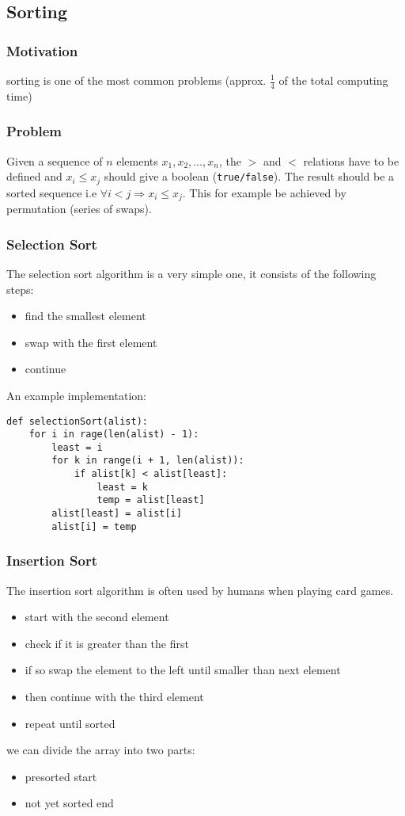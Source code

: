\documentclass[a4paper]{article}
\begin{document}
\subsection{Sorting}
\subsubsection{Motivation}
sorting is one of the most common problems (approx. $ \frac{1}{4} $ of the total computing time)
\subsubsection{Problem}
Given a sequence of $ n $ elements $ x _{1}, x _{2} , \dots, x _{n} $, the $ > $ and $ < $ relations have to be defined and $ x _{i} \leq x _{j} $ should give a boolean (\texttt{true/false}).
The result should be a sorted sequence i.e $ \forall i < j \Rightarrow x_{i} \leq x _{j} $.
This for example be achieved by permutation (series of swaps).
\subsubsection{Selection Sort}
The selection sort algorithm is a very simple one, it consists of the following steps:
\begin{itemize}
    \item find the smallest element
    \item swap with the first element
    \item continue
\end{itemize}
An example implementation:

\begin{lstlisting}
def selectionSort(alist):
    for i in rage(len(alist) - 1):
        least = i
        for k in range(i + 1, len(alist)):
            if alist[k] < alist[least]:
                least = k
                temp = alist[least]
        alist[least] = alist[i]
        alist[i] = temp
\end{lstlisting}

\subsubsection{Insertion Sort}
The insertion sort algorithm is often used by humans when playing card games.
\begin{itemize}
    \item start with the second element
    \item check if it is greater than the first
    \item if so swap the element to the left until smaller than next element
    \item then continue with the third element
    \item repeat until sorted
\end{itemize}
we can divide the array into two parts:
\begin{itemize}
    \item presorted start
    \item not yet sorted end
\end{itemize}
\end{document}
